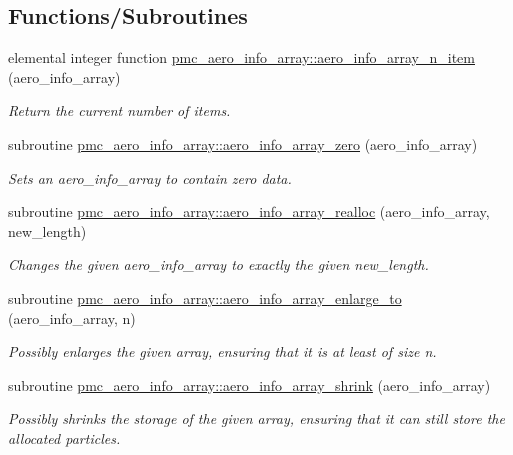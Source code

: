 \subsection*{Functions/\+Subroutines}
\begin{DoxyCompactItemize}
\item 
elemental integer function \mbox{\hyperlink{namespacepmc__aero__info__array_a0704e78a0bc96744d181384d88dff2ee}{pmc\+\_\+aero\+\_\+info\+\_\+array\+::aero\+\_\+info\+\_\+array\+\_\+n\+\_\+item}} (aero\+\_\+info\+\_\+array)
\begin{DoxyCompactList}\small\item\em Return the current number of items. \end{DoxyCompactList}\item 
subroutine \mbox{\hyperlink{namespacepmc__aero__info__array_aceb12e9f541f4df8ab3c5d4a37e75072}{pmc\+\_\+aero\+\_\+info\+\_\+array\+::aero\+\_\+info\+\_\+array\+\_\+zero}} (aero\+\_\+info\+\_\+array)
\begin{DoxyCompactList}\small\item\em Sets an aero\+\_\+info\+\_\+array to contain zero data. \end{DoxyCompactList}\item 
subroutine \mbox{\hyperlink{namespacepmc__aero__info__array_a4ce2e5c40bd09ddd7b86c03089bd828d}{pmc\+\_\+aero\+\_\+info\+\_\+array\+::aero\+\_\+info\+\_\+array\+\_\+realloc}} (aero\+\_\+info\+\_\+array, new\+\_\+length)
\begin{DoxyCompactList}\small\item\em Changes the given aero\+\_\+info\+\_\+array to exactly the given new\+\_\+length. \end{DoxyCompactList}\item 
subroutine \mbox{\hyperlink{namespacepmc__aero__info__array_a0ae4f267424b779e7b985ecda84ced0e}{pmc\+\_\+aero\+\_\+info\+\_\+array\+::aero\+\_\+info\+\_\+array\+\_\+enlarge\+\_\+to}} (aero\+\_\+info\+\_\+array, n)
\begin{DoxyCompactList}\small\item\em Possibly enlarges the given array, ensuring that it is at least of size n. \end{DoxyCompactList}\item 
subroutine \mbox{\hyperlink{namespacepmc__aero__info__array_a650cc8280450e226b94303abeeddaf6a}{pmc\+\_\+aero\+\_\+info\+\_\+array\+::aero\+\_\+info\+\_\+array\+\_\+shrink}} (aero\+\_\+info\+\_\+array)
\begin{DoxyCompactList}\small\item\em Possibly shrinks the storage of the given array, ensuring that it can still store the allocated particles. \end{DoxyCompactList}\item 

\end{DoxyCompactItemize}

